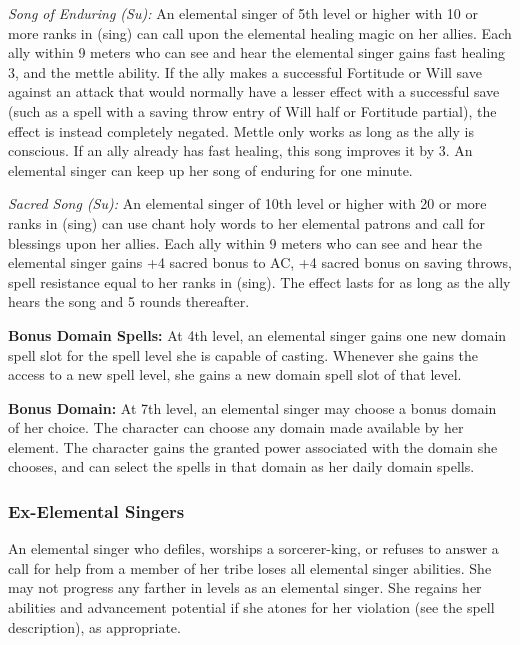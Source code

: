 {\textit{Song of Enduring (Su):} An elemental singer of 5th level or higher with 10 or more ranks in  (sing) can call upon the elemental healing magic on her allies. Each ally within 9 meters who can see and hear the elemental singer gains fast healing 3, and the mettle ability. If the ally makes a successful Fortitude or Will save against an attack that would normally have a lesser effect with a successful save (such as a spell with a saving throw entry of Will half or Fortitude partial), the effect is instead completely negated. Mettle only works as long as the ally is conscious. If an ally already has fast healing, this song improves it by 3. An elemental singer can keep up her song of enduring for one minute.

\textit{Sacred Song (Su):} An elemental singer of 10th level or higher with 20 or more ranks in  (sing) can use chant holy words to her elemental patrons and call for blessings upon her allies. Each ally within 9 meters who can see and hear the elemental singer gains +4 sacred bonus to AC, +4 sacred bonus on saving throws, spell resistance equal to her ranks in  (sing). The effect lasts for as long as the ally hears the song and 5 rounds thereafter.

\textbf{Bonus Domain Spells:} At 4th level, an elemental singer gains one new domain spell slot for the spell level she is capable of casting. Whenever she gains the access to a new spell level, she gains a new domain spell slot of that level.

\textbf{Bonus Domain:} At 7th level, an elemental singer may choose a bonus domain of her choice. The character can choose any domain made available by her element. The character gains the granted power associated with the domain she chooses, and can select the spells in that domain as her daily domain spells.

\subsubsection{Ex-Elemental Singers}
An elemental singer who defiles, worships a sorcerer-king, or refuses to answer a call for help from a member of her tribe loses all elemental singer abilities. She may not progress any farther in levels as an elemental singer. She regains her abilities and advancement potential if she atones for her violation (see the  spell description), as appropriate.
}
